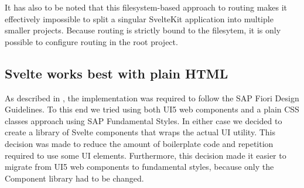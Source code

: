 It has also to be noted that this filesystem-based approach to routing makes it effectively impossible to split a singular SvelteKit application into multiple smaller projects. Because routing is strictly bound to the filesytem, it is only possible to configure routing in the root project.



\subsection{Svelte works best with plain HTML}
\label{sec:evaluation-ui-libs}

As described in , the implementation was required to follow the SAP Fiori Design Guidelines. To this end we tried using both UI5 web components and a plain CSS classes approach using SAP Fundamental Styles. In either case we decided to create a library of Svelte components that wraps the actual UI utility. This decision was made to reduce the amount of boilerplate code and repetition required to use some UI elements. Furthermore, this decision made it easier to migrate from UI5 web components to fundamental styles, because only the Component library had to be changed. 






